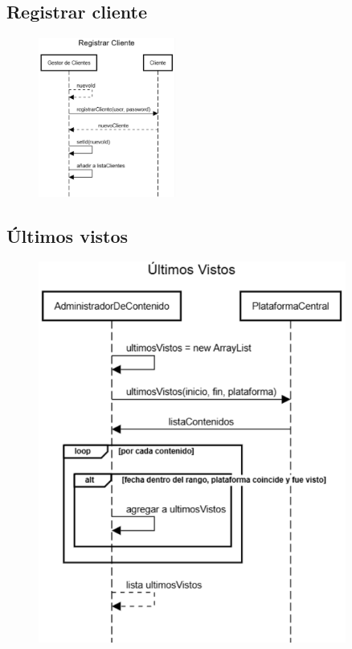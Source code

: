 \subsection{Registrar cliente}\label{subsec:registrar-cliente}
\begin{figure}[h]
    \centering
    \includegraphics[width=0.4\textwidth]{img/registrar.png}
\end{figure}

\clearpage

\subsection{Últimos vistos}\label{subsec:ultimos-vistos}
\begin{figure}[h]
    \centering
    \includegraphics[width=0.9\textwidth]{img/ultimos_vistos.png}
\end{figure}

